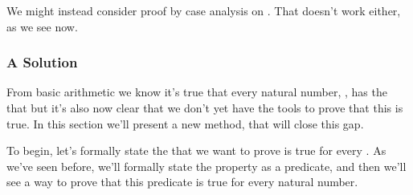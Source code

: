 \documentclass[letterpaper,10pt,english]{sphinxmanual}
\begin{document}
\begin{sphinxVerbatim}[commandchars=\\\{\}]
         
 
 \PYG{o}{[}\PYG{o}{]}
\end{sphinxVerbatim}

\sphinxAtStartPar
We might instead consider proof by case analysis
on . That doesn’t work either, as we see now.

\begin{sphinxVerbatim}[commandchars=\\\{\}]
         
 
   
 \PYG{o}{[}\PYG{o}{]}
 \PYG{o}{[}\PYG{o}{]}
\end{sphinxVerbatim}


\subsubsection{A Solution}
\label{\detokenize{A_03_Recursive_Types:a-solution}}
\sphinxAtStartPar
From basic arithmetic we know it’s true that
every natural number, , has the 
that  but it’s also now clear that
we don’t yet have the tools to prove that this
is true. In this section we’ll present a new
method,  that will close
this gap.

\sphinxAtStartPar
To begin, let’s formally state the 
that we want to prove is true for every .
As we’ve seen before, we’ll formally state the
property as a predicate, and then we’ll see a
way to prove that this predicate is true for
every natural number.
\end{document}
